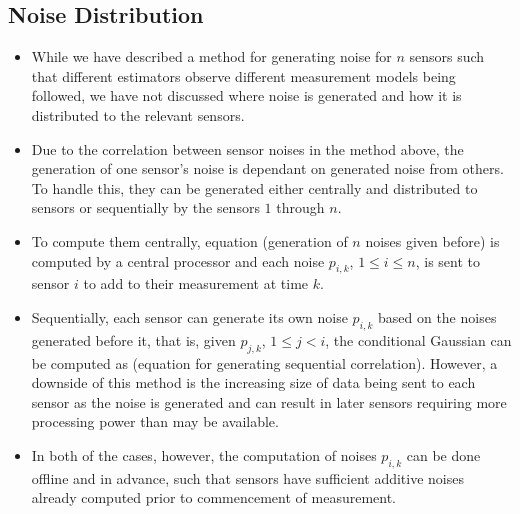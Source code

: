 \documentclass[conference]{IEEEtran}
\begin{document}
\subsection{Noise Distribution}\label{subsec:noise_dist}
\begin{itemize}
  \item While we have described a method for generating noise for $n$ sensors such that different estimators observe different measurement models being followed, we have not discussed where noise is generated and how it is distributed to the relevant sensors.
  \item Due to the correlation between sensor noises in the method above, the generation of one sensor's noise is dependant on generated noise from others. To handle this, they can be generated either centrally and distributed to sensors or sequentially by the sensors $1$ through $n$.
  \item To compute them centrally, equation (generation of $n$ noises given before) is computed by a central processor and each noise $p_{i,k}$, $1\leq i \leq n$, is sent to sensor $i$ to add to their measurement at time $k$.
  \item Sequentially, each sensor can generate its own noise $p_{i,k}$ based on the noises generated before it, that is, given $p_{j,k}$, $1\leq j<i$, the conditional Gaussian can be computed as (equation for generating sequential correlation). However, a downside of this method is the increasing size of data being sent to each sensor as the noise is generated and can result in later sensors requiring more processing power than may be available.
  \item In both of the cases, however, the computation of noises $p_{i,k}$ can be done offline and in advance, such that sensors have sufficient additive noises already computed prior to commencement of measurement.
\end{itemize}

% 
%                                                                   
%                                                                   
%                                                                   
% 
\end{document}
